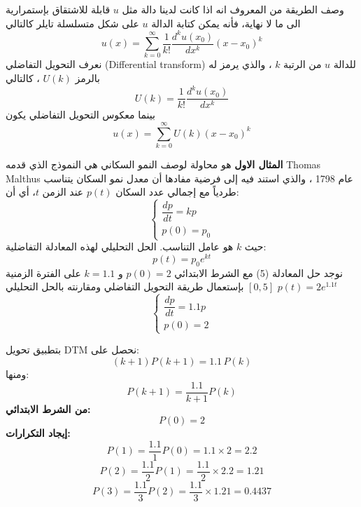 		\begin{frame}{وصف الطريقة}
			من  المعروف انه اذا كانت لدينا دالة مثل $u$ قابلة للاشتقاق بإستمرارية الى ما لا نهاية، فأنه يمكن كتابة الدالة $u$ على شكل متسلسلة تايلر كالتالي
			\begin{equation}
				u(x) = \sum_{k=0}^{\infty} \frac{1}{k!} \frac{d^k u(x_0)}{dx^k} (x - x_0)^k
			\end{equation}
			نعرف التحويل التفاضلي (Differential transform) للدالة $u$ من الرتبة $k$ ، والذي يرمز له بالرمز $U(k)$ ، كالتالي
			\begin{equation}
				U(k) = \frac{1}{k!} \frac{d^k u(x_0)}{dx^k}
			\end{equation}
			بينما معكوس التحويل التفاضلي يكون
			\begin{equation}
				u(x) = \sum_{k=0}^{\infty} U(k) (x - x_0)^k
			\end{equation}
		\end{frame}
		
		\begin{frame}
				\textbf{المثال الاول} هو محاولة لوصف النمو السكاني هي النموذج الذي قدمه Thomas Malthus عام 1798 ، والذي استند فيه إلى فرضية مفادها أن معدل نمو السكان يتناسب طردياً مع إجمالي عدد السكان $p(t)$ عند الزمن $t$، أي أن:
				\begin{equation}
					\left\{
					\begin{array}{l}
						\dfrac{dp}{dt} = kp\\
						p(0) = p_0
					\end{array}
					\right.
				\end{equation}
				حيث $k$ هو عامل التناسب. الحل التحليلي لهذه المعادلة التفاضلية:
				\begin{equation}
					p(t) = p_0 e^{kt}
				\end{equation}
				نوجد حل المعادلة (5) مع الشرط الابتدائي
				$p(0)=2$ و $k=1.1$ على الفترة الزمنية $[0,5]$ بإستعمال طريقة التحويل التفاضلي ومقارنته بالحل التحليلي
				$p(t) = 2 e^{1.1t}$
				\begin{equation}
					\left\{
					\begin{array}{l}
						\dfrac{dp}{dt} = 1.1p\\
						p(0) = 2
					\end{array}
					\right.
				\end{equation}
		\end{frame}
		
		\begin{frame}
			
			بتطبيق تحويل DTM نحصل على:
			\[
			(k+1)P(k+1) = 1.1\,P(k)
			\]
			ومنها:
			\[
			P(k+1) = \frac{1.1}{k+1} P(k)
			\]
			\textbf{من الشرط الابتدائي:}
			\[
			P(0)=2
			\]
			\textbf{إيجاد التكرارات:}
			\[
			P(1) = \frac{1.1}{1}P(0) = 1.1 \times 2 = 2.2
			\]
			\[
			P(2) = \frac{1.1}{2}P(1) = \frac{1.1}{2} \times 2.2 = 1.21
			\]	
			\[
			P(3) = \frac{1.1}{3}P(2) = \frac{1.1}{3} \times 1.21 = 0.4437
			\]
		\end{frame}
		
